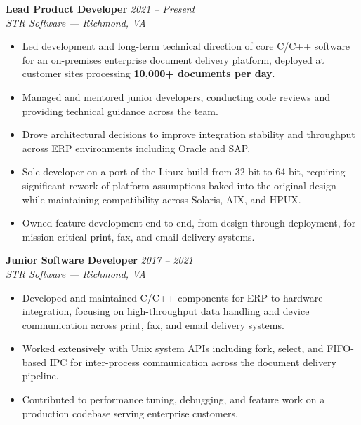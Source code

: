 \documentclass[11pt, letterpaper]{article}
\begin{document}
\noindent\textbf{Lead Product Developer} \hfill \textit{2021 -- Present}\\
\textit{STR Software --- Richmond, VA}\\[4pt]
\begin{itemize}
  \item Led development and long-term technical direction of core C/C++ software for an on-premises enterprise document delivery platform, deployed at customer sites processing \textbf{10,000+ documents per day}.
  \item Managed and mentored junior developers, conducting code reviews and providing technical guidance across the team.
  \item Drove architectural decisions to improve integration stability and throughput across ERP environments including Oracle and SAP.
  \item Sole developer on a port of the Linux build from 32-bit to 64-bit, requiring significant rework of platform assumptions baked into the original design while maintaining compatibility across Solaris, AIX, and HPUX.
  \item Owned feature development end-to-end, from design through deployment, for mission-critical print, fax, and email delivery systems.
\end{itemize}

\vspace{6pt}

\noindent\textbf{Junior Software Developer} \hfill \textit{2017 -- 2021}\\
\textit{STR Software --- Richmond, VA}\\[4pt]
\begin{itemize}
  \item Developed and maintained C/C++ components for ERP-to-hardware integration, focusing on high-throughput data handling and device communication across print, fax, and email delivery systems.
  \item Worked extensively with Unix system APIs including fork, select, and FIFO-based IPC for inter-process communication across the document delivery pipeline.
  \item Contributed to performance tuning, debugging, and feature work on a production codebase serving enterprise customers.
\end{itemize}

\end{document}
